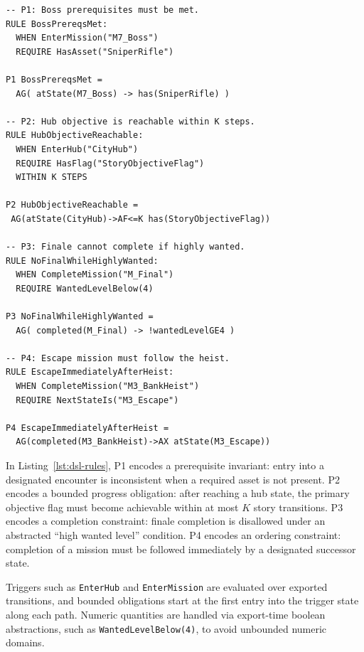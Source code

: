 \documentclass[conference]{IEEEtran}
\begin{document}
\begin{lstlisting}[style=UBListingDSL,float=htbp,
                   caption={Representative continuity rules in the DSL,
together with their temporal-property interpretations (P1--P4). Bounded
reachability uses a step bound $K$ over exported story transitions. $AF^{\le K}$ denotes a step-bounded eventuality, encoded by bounded unrolling up to depth $K$ (Section~\ref{sec:algorithms}).},
                   label={lst:dsl-rules}]                   
-- P1: Boss prerequisites must be met.
RULE BossPrereqsMet:
  WHEN EnterMission("M7_Boss")
  REQUIRE HasAsset("SniperRifle")

P1 BossPrereqsMet =
  AG( atState(M7_Boss) -> has(SniperRifle) )

-- P2: Hub objective is reachable within K steps.
RULE HubObjectiveReachable:
  WHEN EnterHub("CityHub")
  REQUIRE HasFlag("StoryObjectiveFlag")
  WITHIN K STEPS

P2 HubObjectiveReachable =
 AG(atState(CityHub)->AF<=K has(StoryObjectiveFlag))

-- P3: Finale cannot complete if highly wanted.
RULE NoFinalWhileHighlyWanted:
  WHEN CompleteMission("M_Final")
  REQUIRE WantedLevelBelow(4)

P3 NoFinalWhileHighlyWanted =
  AG( completed(M_Final) -> !wantedLevelGE4 )

-- P4: Escape mission must follow the heist.
RULE EscapeImmediatelyAfterHeist:
  WHEN CompleteMission("M3_BankHeist")
  REQUIRE NextStateIs("M3_Escape")

P4 EscapeImmediatelyAfterHeist =
  AG(completed(M3_BankHeist)->AX atState(M3_Escape))
\end{lstlisting}

In Listing~\ref{lst:dsl-rules}, P1 encodes a prerequisite invariant: entry into a designated encounter
is inconsistent when a required asset is not present. P2 encodes a
bounded progress obligation: after reaching a hub state, the primary
objective flag must become achievable within at most $K$ story
transitions. P3 encodes a completion constraint: finale completion is
disallowed under an abstracted ``high wanted level'' condition. P4
encodes an ordering constraint: completion of a mission must be followed
immediately by a designated successor state.

Triggers such as \texttt{EnterHub} and \texttt{EnterMission} are
evaluated over exported transitions, and bounded obligations start at
the first entry into the trigger state along each path. Numeric
quantities are handled via export-time boolean abstractions, such as
\texttt{WantedLevelBelow(4)}, to avoid unbounded numeric domains.
\end{document}
